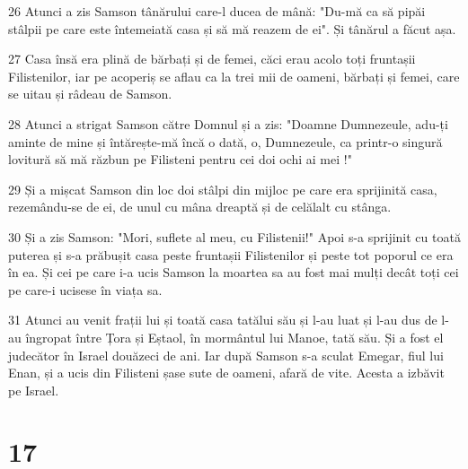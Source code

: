 \par 26 Atunci a zis Samson tânărului care-l ducea de mână: "Du-mă ca să pipăi stâlpii pe care este întemeiată casa și să mă reazem de ei". Și tânărul a făcut așa.
\par 27 Casa însă era plină de bărbați și de femei, căci erau acolo toți fruntașii Filistenilor, iar pe acoperiș se aflau ca la trei mii de oameni, bărbați și femei, care se uitau și râdeau de Samson.
\par 28 Atunci a strigat Samson către Domnul și a zis: "Doamne Dumnezeule, adu-ți aminte de mine și întărește-mă încă o dată, o, Dumnezeule, ca printr-o singură lovitură să mă răzbun pe Filisteni pentru cei doi ochi ai mei !"
\par 29 Și a mișcat Samson din loc doi stâlpi din mijloc pe care era sprijinită casa, rezemându-se de ei, de unul cu mâna dreaptă și de celălalt cu stânga.
\par 30 Și a zis Samson: "Mori, suflete al meu, cu Filistenii!" Apoi s-a sprijinit cu toată puterea și s-a prăbușit casa peste fruntașii Filistenilor și peste tot poporul ce era în ea. Și cei pe care i-a ucis Samson la moartea sa au fost mai mulți decât toți cei pe care-i ucisese în viața sa.
\par 31 Atunci au venit frații lui și toată casa tatălui său și l-au luat și l-au dus de l-au îngropat între Țora și Eștaol, în mormântul lui Manoe, tată său. Și a fost el judecător în Israel douăzeci de ani. Iar după Samson s-a sculat Emegar, fiul lui Enan, și a ucis din Filisteni șase sute de oameni, afară de vite. Acesta a izbăvit pe Israel.

\chapter{17}

